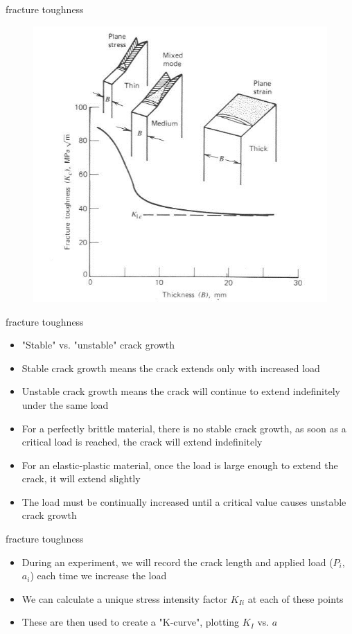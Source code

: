 \documentclass[10pt]{beamer}
\begin{document}
\begin{frame}{fracture toughness}
	\begin{figure}
	\centering
	\includegraphics[width=0.7\linewidth]{KIC_thickness}
	\label{fig:KIC_thickness}
\end{figure}
\end{frame}

\begin{frame}{fracture toughness}
	\begin{itemize}[<+->]
		\item "Stable" vs. "unstable" crack growth
		\item Stable crack growth means the crack extends only with increased load
		\item Unstable crack growth means the crack will continue to extend indefinitely under the same load
		\item For a perfectly brittle material, there is no stable crack growth, as soon as a critical load is reached, the crack will extend indefinitely
		\item For an elastic-plastic material, once the load is large enough to extend the crack, it will extend slightly
		\item The load must be continually increased until a critical value causes unstable crack growth
	\end{itemize}
\end{frame}

\begin{frame}{fracture toughness}
	\begin{itemize}[<+->]
		\item During an experiment, we will record the crack length and applied load ($P_i$, $a_i$) each time we increase the load
		\item We can calculate a unique stress intensity factor $K_{Ii}$ at each of these points
		\item These are then used to create a "K-curve", plotting $K_I$ vs. $a$
	\end{itemize}
\end{frame}
\end{document}
